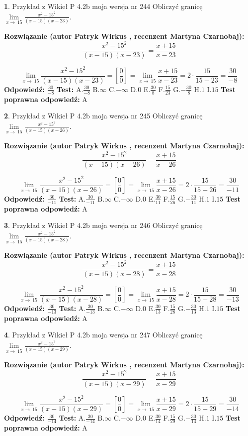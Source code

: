 \documentclass[12pt, a4paper]{article}
\theoremstyle{definition} %
\newtheorem{zad}{}
\newcommand{\zadStart}[1]{\begin{zad}#1\newline}
\newcommand{\zadStop}{\end{zad}}
\newcommand{\rozwStart}[2]{\noindent \textbf{Rozwiązanie (autor #1 , recenzent #2): }\newline}
\newcommand{\rozwStop}{\newline}
\newcommand{\odpStart}{\noindent \textbf{Odpowiedź:}\newline}
\newcommand{\odpStop}{\newline}
\newcommand{\testStart}{\noindent \textbf{Test:}\newline}
\newcommand{\testStop}{\newline}
\newcommand{\kluczStart}{\noindent \textbf{Test poprawna odpowiedź:}\newline}
\newcommand{\kluczStop}{\newline}
\begin{document}
\zadStart{Przykład z Wikieł P 4.2b moja wersja nr 244}
Obliczyć granicę $\lim\limits_{x\to\ 15}\frac{x^{2}-15^{2}}{(x-15)(x-23)}$.
\zadStop
\rozwStart{Patryk Wirkus}{Martyna Czarnobaj}
$$\frac{x^{2}-15^{2}}{(x-15)(x-23)}=\frac{x+15}{x-23}$$

$$\lim\limits_{x\to\ 15}\frac{x^{2}-15^{2}}{(x-15)(x-23)}=[\frac{0}{0}]=\lim\limits_{x\to\ 15}\frac{x+15}{x-23}=2 \cdot \frac{15}{15-23} = \frac{30}{-8}$$
\rozwStop
\odpStart
$\frac{30}{-8}$
\odpStop
\testStart
A.$\frac{30}{-8}$
B.$\infty$
C.$-\infty$
D.$0$
E.$\frac{30}{8}$
F.$\frac{15}{23}$
G.$-\frac{30}{8}$
H.$1$
I.$15$
\testStop
\kluczStart
A
\kluczStop



\zadStart{Przykład z Wikieł P 4.2b moja wersja nr 245}
Obliczyć granicę $\lim\limits_{x\to\ 15}\frac{x^{2}-15^{2}}{(x-15)(x-26)}$.
\zadStop
\rozwStart{Patryk Wirkus}{Martyna Czarnobaj}
$$\frac{x^{2}-15^{2}}{(x-15)(x-26)}=\frac{x+15}{x-26}$$

$$\lim\limits_{x\to\ 15}\frac{x^{2}-15^{2}}{(x-15)(x-26)}=[\frac{0}{0}]=\lim\limits_{x\to\ 15}\frac{x+15}{x-26}=2 \cdot \frac{15}{15-26} = \frac{30}{-11}$$
\rozwStop
\odpStart
$\frac{30}{-11}$
\odpStop
\testStart
A.$\frac{30}{-11}$
B.$\infty$
C.$-\infty$
D.$0$
E.$\frac{30}{11}$
F.$\frac{15}{26}$
G.$-\frac{30}{11}$
H.$1$
I.$15$
\testStop
\kluczStart
A
\kluczStop



\zadStart{Przykład z Wikieł P 4.2b moja wersja nr 246}
Obliczyć granicę $\lim\limits_{x\to\ 15}\frac{x^{2}-15^{2}}{(x-15)(x-28)}$.
\zadStop
\rozwStart{Patryk Wirkus}{Martyna Czarnobaj}
$$\frac{x^{2}-15^{2}}{(x-15)(x-28)}=\frac{x+15}{x-28}$$

$$\lim\limits_{x\to\ 15}\frac{x^{2}-15^{2}}{(x-15)(x-28)}=[\frac{0}{0}]=\lim\limits_{x\to\ 15}\frac{x+15}{x-28}=2 \cdot \frac{15}{15-28} = \frac{30}{-13}$$
\rozwStop
\odpStart
$\frac{30}{-13}$
\odpStop
\testStart
A.$\frac{30}{-13}$
B.$\infty$
C.$-\infty$
D.$0$
E.$\frac{30}{13}$
F.$\frac{15}{28}$
G.$-\frac{30}{13}$
H.$1$
I.$15$
\testStop
\kluczStart
A
\kluczStop



\zadStart{Przykład z Wikieł P 4.2b moja wersja nr 247}
Obliczyć granicę $\lim\limits_{x\to\ 15}\frac{x^{2}-15^{2}}{(x-15)(x-29)}$.
\zadStop
\rozwStart{Patryk Wirkus}{Martyna Czarnobaj}
$$\frac{x^{2}-15^{2}}{(x-15)(x-29)}=\frac{x+15}{x-29}$$

$$\lim\limits_{x\to\ 15}\frac{x^{2}-15^{2}}{(x-15)(x-29)}=[\frac{0}{0}]=\lim\limits_{x\to\ 15}\frac{x+15}{x-29}=2 \cdot \frac{15}{15-29} = \frac{30}{-14}$$
\rozwStop
\odpStart
$\frac{30}{-14}$
\odpStop
\testStart
A.$\frac{30}{-14}$
B.$\infty$
C.$-\infty$
D.$0$
E.$\frac{30}{14}$
F.$\frac{15}{29}$
G.$-\frac{30}{14}$
H.$1$
I.$15$
\testStop
\kluczStart
A
\kluczStop
\end{document}
